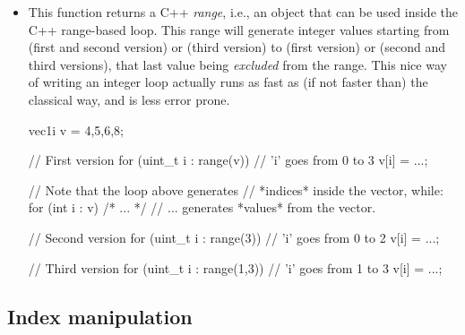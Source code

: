 \documentclass[12pt]{report}
\newenvironment{example}
{
    \begin{mdframed}[style=example,frametitle={Example}]
}
{
    \end{mdframed}
}
\begin{document}
\begin{itemize}
\item {} 



This function returns a C++ \emph{range}, i.e., an object that can be used inside the C++ range-based  loop. This range will generate integer values starting from  (first and second version) or  (third version) to  (first version) or  (second and third versions), that last value being \emph{excluded} from the range. This nice way of writing an integer  loop actually runs as fast as (if not faster than) the classical way, and is less error prone.

\begin{example}
\begin{cppcode}
vec1i v = {4,5,6,8};

// First version
for (uint_t i : range(v)) {
    // 'i' goes from 0 to 3
    v[i] = ...;
}

// Note that the loop above generates
// *indices* inside the vector, while:
for (int i : v) { /* ... */ }
// ... generates *values* from the vector.

// Second version
for (uint_t i : range(3)) {
    // 'i' goes from 0 to 2
    v[i] = ...;
}

// Third version
for (uint_t i : range(1,3)) {
    // 'i' goes from 1 to 3
    v[i] = ...;
}
\end{cppcode}
\end{example}
\end{itemize}

\subsection{Index manipulation}
\end{document}
